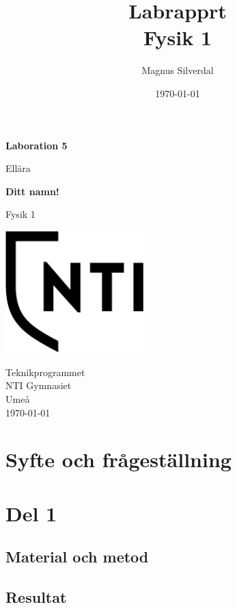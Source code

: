 \documentclass[11p]{article}
\title{Labrapprt \\ \small Fysik 1}
\author{Magnus Silverdal }
\date{\today}
\begin{document}
    \begin{titlepage}
        \begin{center}
            \vspace*{1cm}

            \Huge
            \textbf{Laboration 5}

            \vspace{0.5cm}
            \LARGE
            Ellära

            \vspace{1.5cm}

            \textbf{Ditt namn!}

            \vfill


            Fysik 1

            \vspace{0.8cm}

            \includegraphics[width=0.4\textwidth]{NTI Gymnasiet_Symbol_print_svart.png}

            \Large
            Teknikprogrammet\\
            NTI Gymnasiet\\
            Umeå\\
            \today

        \end{center}
    \end{titlepage}
    \section{Syfte och frågeställning}
    \section{Del 1}
    \subsection{Material och metod}
    \subsection{Resultat}
\end{document}
